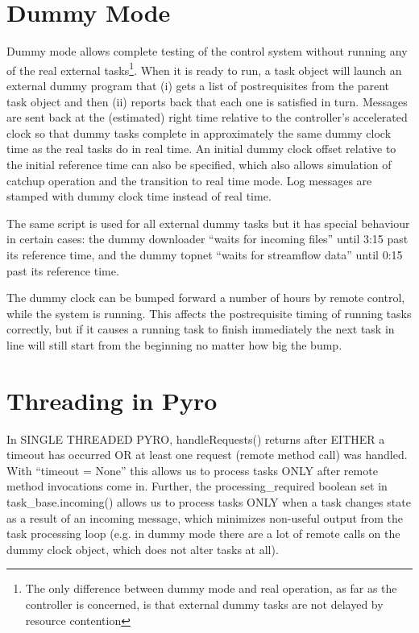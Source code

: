 \documentclass[12pt]{amsart}
\begin{document}
\appendix

\section{Dummy Mode}

Dummy mode allows complete testing of the control system without running
any of the real external tasks\footnote{The only difference between
dummy mode and real operation, as far as the controller is concerned, is
that external dummy tasks are not delayed by resource contention}.  When
it is ready to run, a task object will launch an external dummy program
that (i) gets a list of postrequisites from the parent task object and
then (ii) reports back that each one is satisfied in turn.  Messages are
sent back at the (estimated) right time relative to the controller's
accelerated clock so that dummy tasks complete in approximately the same
dummy clock time as the real tasks do in real time. An initial dummy
clock offset relative to the initial reference time can also be
specified, which also allows simulation of catchup operation and the
transition to real time mode.  Log messages are stamped with dummy clock
time instead of real time.

The same script is used for all external dummy tasks but it has special
behaviour in certain cases: the dummy downloader ``waits for incoming
files'' until 3:15 past its reference time, and the dummy topnet ``waits
for streamflow data'' until 0:15 past its reference time.

The dummy clock can be bumped forward a number of hours by remote
control, while the system is running. This affects the postrequisite
timing of running tasks correctly, but if it causes a running task to
finish immediately the next task in line will still start from the
beginning no matter how big the bump.


\section{Threading in Pyro}

In SINGLE THREADED PYRO, handleRequests() returns after EITHER a timeout has
occurred OR at least one request (remote method call) was handled.  With
``timeout = None'' this allows us to process tasks ONLY after remote method
invocations come in. Further, the processing\_required boolean set in
task\_base.incoming() allows us to process tasks ONLY when a task changes state
as a result of an incoming message, which minimizes non-useful output from the
task processing loop (e.g. in dummy mode there are a lot of remote calls on
the dummy clock object, which does not alter tasks at all). 
\end{document}
